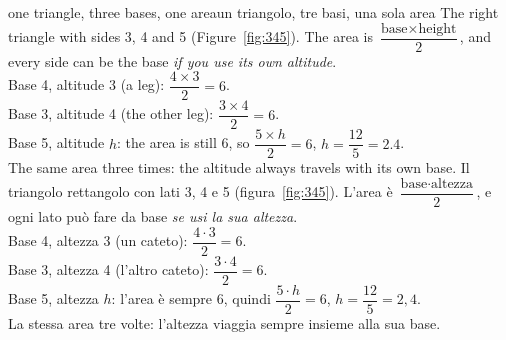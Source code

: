 \documentclass[10pt,a4paper,oneside]{book}
\begin{document}
\begin{example}{one triangle, three bases, one area}{un triangolo, tre basi, una sola area}
The right triangle with sides 3, 4 and 5 (Figure~\ref{fig:345}). The area is $\dfrac{\text{base} \times \text{height}}{2}$, and every side can be the base \emph{if you use its own altitude}.\\
Base 4, altitude 3 (a leg): $\dfrac{4 \times 3}{2} = 6$.\\
Base 3, altitude 4 (the other leg): $\dfrac{3 \times 4}{2} = 6$.\\
Base 5, altitude $h$: the area is still 6, so $\dfrac{5 \times h}{2} = 6$, $h = \dfrac{12}{5} = 2.4$.\\
The same area three times: the altitude always travels with its own base.
\tcblower
Il triangolo rettangolo con lati 3, 4 e 5 (figura~\ref{fig:345}). L'area è $\dfrac{\text{base} \cdot \text{altezza}}{2}$, e ogni lato può fare da base \emph{se usi la sua altezza}.\\
Base 4, altezza 3 (un cateto): $\dfrac{4 \cdot 3}{2} = 6$.\\
Base 3, altezza 4 (l'altro cateto): $\dfrac{3 \cdot 4}{2} = 6$.\\
Base 5, altezza $h$: l'area è sempre 6, quindi $\dfrac{5 \cdot h}{2} = 6$, $h = \dfrac{12}{5} = 2{,}4$.\\
La stessa area tre volte: l'altezza viaggia sempre insieme alla sua base.
\end{example}
\end{document}
